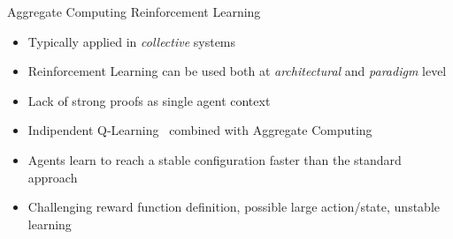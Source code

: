 \begin{frame}{Aggregate Computing \faPlus[left] Reinforcement Learning}
  \begin{cardTiny}
    \begin{itemize}
      \item Typically applied in \textit{collective} systems~\cite{DBLP:conf/icse/DAngeloGGGNPT19}
      \item Reinforcement Learning can be used both at \textit{architectural} and \textit{paradigm} level
      \item [\failure{\faThumbsDown}] Lack of strong proofs as single agent context
    \end{itemize}
  \end{cardTiny}
  \begin{card}
    \begin{itemize}  
      \item Indipendent Q-Learning~\cite{watkins1992q} combined with Aggregate Computing
      \item Agents learn to reach a stable configuration faster than the standard approach
      \item[\failure{\faThumbsDown}] Challenging reward function definition, possible large action/state, unstable learning
    \end{itemize}
  \end{card}
\end{frame}